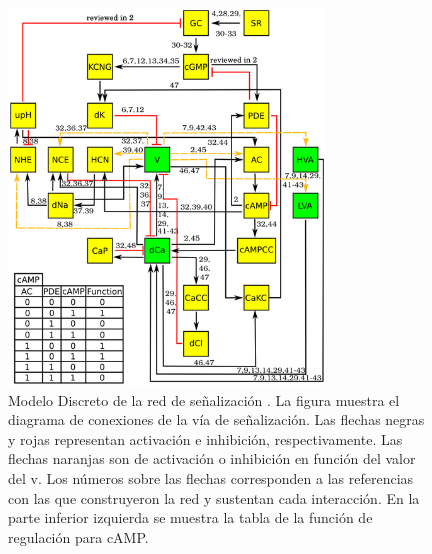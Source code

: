 \begin{figure}[hbt]
\includegraphics[width=0.9\linewidth,height=10cm]{gfx/redErizoModelo}
\caption[Modelo Discreto de la red de se\~nalizaci\'on]{Modelo Discreto de la red de se\~nalizaci\'on \citeauthor{Espinal2011} \citep{Espinal2011}. La figura muestra el diagrama de conexiones de la vía de señalización. Las flechas negras y rojas representan activación e inhibición, respectivamente. Las flechas naranjas son de activación o inhibición en función del valor del \acf{v}. Los números sobre las flechas corresponden a las referencias con las que \citeauthor{Espinal2011} \citep{Espinal2011} construyeron la red y sustentan cada interacción. En la parte inferior izquierda se muestra la tabla de la función de regulación para \ac{cAMP}.%
}\label{fig:erizoModelo}
\end{figure}

